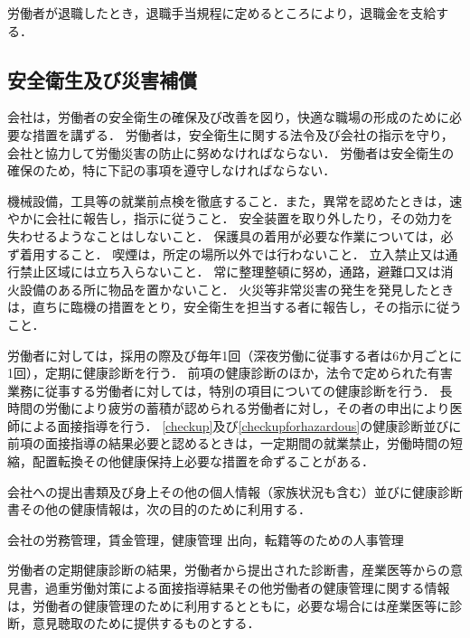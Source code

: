 \documentclass[11pt,a4paper]{jsarticle}
\begin{document}
労働者が退職したとき，退職手当規程に定めるところにより，退職金を支給する．
\label{para:severance}

\subsection{安全衛生及び災害補償}

会社は，労働者の安全衛生の確保及び改善を図り，快適な職場の形成のために必要な措置を講ずる．
\term
労働者は，安全衛生に関する法令及び会社の指示を守り，会社と協力して労働災害の防止に努めなければならない．
\term
労働者は安全衛生の確保のため，特に下記の事項を遵守しなければならない．
\begin{enumerate}
	\itm 機械設備，工具等の就業前点検を徹底すること．また，異常を認めたときは，速やかに会社に報告し，指示に従うこと．
	\itm 安全装置を取り外したり，その効力を失わせるようなことはしないこと．
	\itm 保護具の着用が必要な作業については，必ず着用すること．
	\itm 喫煙は，所定の場所以外では行わないこと．
	\itm 立入禁止又は通行禁止区域には立ち入らないこと．
	\itm 常に整理整頓に努め，通路，避難口又は消火設備のある所に物品を置かないこと．
	\itm 火災等非常災害の発生を発見したときは，直ちに臨機の措置をとり，安全衛生を担当する者に報告し，その指示に従うこと．
\end{enumerate}

労働者に対しては，採用の際及び毎年1回（深夜労働に従事する者は6か月ごとに1回），定期に健康診断を行う．
\label{checkup}
\term
 前項の健康診断のほか，法令で定められた有害業務に従事する労働者に対しては，特別の項目についての健康診断を行う．
\label{checkupforhazardous}
\term
長時間の労働により疲労の蓄積が認められる労働者に対し，その者の申出により医師による面接指導を行う．
\term
\ref{checkup}及び\ref{checkupforhazardous}の健康診断並びに前項の面接指導の結果必要と認めるときは，一定期間の就業禁止，労働時間の短縮，配置転換その他健康保持上必要な措置を命ずることがある．

会社への提出書類及び身上その他の個人情報（家族状況も含む）並びに健康診断書その他の健康情報は，次の目的のために利用する．
\begin{enumerate}
	\itm 会社の労務管理，賃金管理，健康管理
	\itm 出向，転籍等のための人事管理
\end{enumerate}
\term
労働者の定期健康診断の結果，労働者から提出された診断書，産業医等からの意見書，過重労働対策による面接指導結果その他労働者の健康管理に関する情報は，労働者の健康管理のために利用するとともに，必要な場合には産業医等に診断，意見聴取のために提供するものとする．
\end{document}
